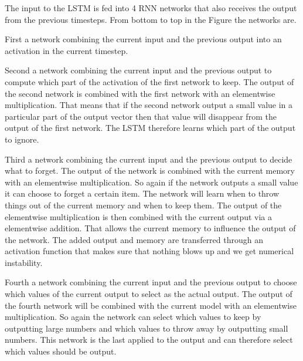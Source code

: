 \begin{description}
        The input to the \gls{LSTM} is fed into 4 \gls{RNN} networks that also
        receives the output from the previous timesteps. From bottom to top in
        the Figure the networks are.

        First a network combining the current input and the previous output into
        an activation in the current timestep.

        Second a network combining the current input and the previous output to
        compute which part of the activation of the first network to keep. The
        output of the second network is combined with the first network with an
        elementwise multiplication. That means that if the second network output
        a small value in a particular part of the output vector then that value
        will disappear from the output of the first network. The \gls{LSTM}
        therefore learns which part of the output to ignore.

        Third a network combining the current input and the previous output
        to decide what to forget. The output of the network is combined with
        the current memory with an elementwise multiplication. So again if the
        network outputs a small value it can choose to forget a certain item.
        The network will learn when to throw things out of the current memory
        and when to keep them. The output of the elementwise multiplication is
        then combined with the current output via a elementwise addition. That
        allows the current memory to influence the output of the network. The
        added output and memory are transferred through an activation function
        that makes sure that nothing blows up and we get numerical instability.

        Fourth a network combining the current input and the previous output
        to choose which values of the current output to select as the actual
        output. The output of the fourth network will be combined with the
        current model with an elementwise multiplication. So again the network
        can select which values to keep by outputting large numbers and which
        values to throw away by outputting small numbers. This network is the
        last applied to the output and can therefore select which values should
        be output.



\end{description}
